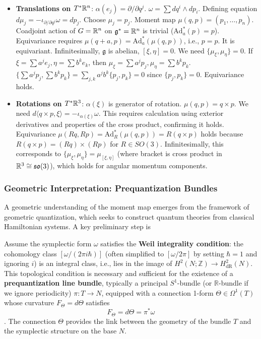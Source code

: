 \begin{example}
\,
\begin{itemize}
    \item \textbf{Translations on $T^*\mathbb{R}^n$}: $\alpha(e_j) = \partial/\partial q^j$. $\omega = \sum dq^i \wedge dp_i$. Defining equation $d\mu_j = -\iota_{\partial/\partial q^j}\omega = dp_j$. Choose $\mu_j = p_j$. Moment map $\mu(q, p) = (p_1, \dots, p_n)$. Coadjoint action of $G=\mathbb{R}^n$ on $\mathfrak{g}^*=\mathbb{R}^n$ is trivial ($\text{Ad}^*_a(p) = p$). Equivariance requires $\mu(q+a, p) = \text{Ad}^*_a(\mu(q,p))$, i.e., $p = p$. It is equivariant. Infinitesimally, $\mathfrak{g}$ is abelian, $[\xi, \eta]=0$. We need $\{\mu_\xi, \mu_\eta\}=0$. If $\xi = \sum a^j e_j, \eta = \sum b^k e_k$, then $\mu_\xi = \sum a^j p_j, \mu_\eta = \sum b^k p_k$. $\{ \sum a^j p_j, \sum b^k p_k \} = \sum_{j,k} a^j b^k \{p_j, p_k\} = 0$ since $\{p_j, p_k\}=0$. Equivariance holds.
    
    \item \textbf{Rotations on $T^*\mathbb{R}^3$}: $\alpha(\xi)$ is generator of rotation. $\mu(q, p) = q \times p$. We need $d\langle q \times p, \xi \rangle = -\iota_{\alpha(\xi)}\omega$. This requires calculation using exterior derivatives and properties of the cross product, confirming it holds. Equivariance $\mu(Rq, Rp) = \text{Ad}^*_R(\mu(q,p)) = R(q \times p)$ holds because $R(q \times p) = (Rq) \times (Rp)$ for $R \in SO(3)$. Infinitesimally, this corresponds to $\{\mu_\xi, \mu_\eta\} = \mu_{[\xi, \eta]}$ (where bracket is cross product in $\mathbb{R}^3 \cong \mathfrak{so}(3)$), which holds for angular momentum components.
\end{itemize}
\end{example}

\subsubsection{Geometric Interpretation: Prequantization Bundles}

A geometric understanding of the moment map emerges from the framework of geometric quantization, which seeks to construct quantum theories from classical Hamiltonian systems. A key preliminary step is 

Assume the symplectic form $\omega$ satisfies the \textbf{Weil integrality condition}: the cohomology class $[\omega / (2\pi i \hbar)]$ (often simplified to $[\omega/2\pi]$ by setting $\hbar=1$ and ignoring $i$) is an integral class, i.e., lies in the image of $H^2(N; \mathbb{Z}) \to H^2_{\text{dR}}(N)$. This topological condition is necessary and sufficient for the existence of a \textbf{prequantization line bundle}, typically a principal $S^1$-bundle (or $\mathbb{R}$-bundle if we ignore periodicity) $\pi: T \to N$, equipped with a connection 1-form $\Theta \in \Omega^{1}(T)$ whose curvature $F_\Theta = d\Theta$ satisfies
\[ F_\Theta = d\Theta = \pi^* \omega \].
The connection $\Theta$ provides the link between the geometry of the bundle $T$ and the symplectic structure on the base $N$.

